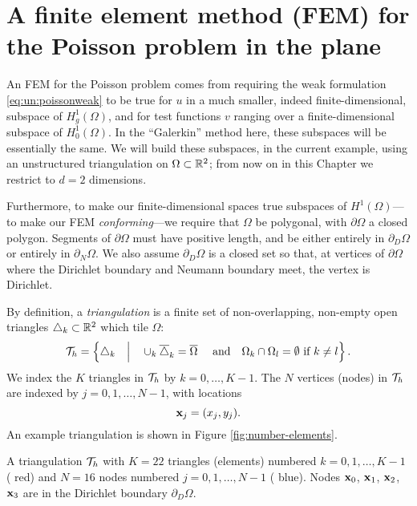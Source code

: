 \section{A finite element method (FEM) for the Poisson problem in the plane}

An FEM for the Poisson problem comes from requiring the weak formulation \eqref{eq:un:poissonweak} to be true for $u$ in a much smaller, indeed finite-dimensional, subspace of $H_g^1(\Omega)$, and for test functions $v$ ranging over a finite-dimensional subspace of $H_0^1(\Omega)$.  In the ``Galerkin'' method here, these subspaces will be essentially the same.  We will build these subspaces, in the current example, using an unstructured triangulation on $\Omega\subset \mathbb{R}^2$; from now on in this Chapter we restrict to $d=2$ dimensions.

Furthermore, to make our finite-dimensional spaces true subspaces of $H^1(\Omega)$---to make our FEM \emph{conforming}---we require that $\Omega$ be polygonal, with $\partial\Omega$ a closed polygon.  Segments of $\partial\Omega$ must have positive length, and be either entirely in $\partial_D\Omega$ or entirely in $\partial_N\Omega$.  We also assume $\partial_D\Omega$ is a closed set so that, at vertices of $\partial \Omega$ where the Dirichlet boundary and Neumann boundary meet, the vertex is Dirichlet.

By definition, a \emph{triangulation} is a finite set of non-overlapping, non-empty open triangles $\triangle_k\subset \mathbb{R}^2$ which tile $\Omega$:
\begin{equation*}
\mathcal{T}_h = \left\{\triangle_k \quad\Big|\quad \cup_k \overline{\triangle}_k = \overline{\Omega} \quad \text{ and} \quad \Omega_k \cap \Omega_l = \emptyset \text{ if } k\ne l\right\}.
\end{equation*}
We index the $K$ triangles in $\mathcal{T}_h$ by $k=0,\dots,K-1$.  The $N$ vertices (nodes) in $\mathcal{T}_h$ are indexed by $j=0,1,\dots,N-1$, with locations
\begin{equation*}
\mathbf{x}_j = (x_j,y_j).
\end{equation*}
An example triangulation is shown in Figure \ref{fig:number-elements}.

\begin{marginfigure}

\caption{A triangulation $\mathcal{T}_h$ with $K=22$ triangles (elements) numbered $k=0,1,\dots,K-1$ ({\color{red} red}) and $N=16$ nodes numbered $j=0,1,\dots,N-1$  ({\color{blue} blue}).  Nodes $\mathbf{x}_0$, $\mathbf{x}_1$, $\mathbf{x}_2$, $\mathbf{x}_3$ are in the Dirichlet boundary $\partial_D\Omega$.}
\label{fig:number-elements}
\end{marginfigure}

